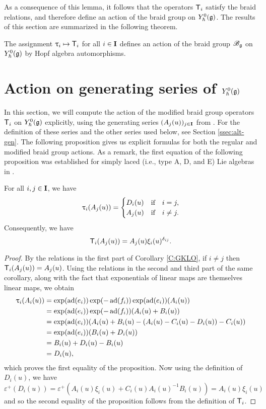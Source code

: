 As a consequence of this lemma, it follows that the operators $\mbraid_i$ satisfy the braid relations, and therefore define an action of the braid group on $\Yhg[0]$.
The results of this section are summarized in the following theorem.

\begin{theorem}\label{T:mbraid-action}
    The assignment $\braid_i\mapsto\mbraid_i$ for all $i\in\I$ defines an action of the braid group $\Bg$ on $\Yhg[0]$ by Hopf algebra automorphisms.
\end{theorem}


\section{Action on generating series of \texorpdfstring{$\Yhg[0]$}{Y0}}

In this section, we will compute the action of the modified braid group operators $\mbraid_i$ on $\Yhg[0]$ explicitly, using the generating series $(A_j(u))_{j\in\I}$ from \cite{gerasimov_class_2005}.
For the definition of these series and the other series used below, see Section \ref{ssec:alt-gen}.
The following proposition gives us explicit formulas for both the regular and modified braid group actions.
As a remark, the first equation of the following proposition was established for simply laced (i.e., type A, D, and E) Lie algebras in \cite[Lemma 5.3.16]{weekes_highest_2016}.

\begin{proposition}\label{P:tau-a}
    For all $i,j\in\I$, we have
    \[\braid_i(A_j(u)) =
    \begin{cases}
        D_i(u) & \text{if}\quad i=j, \\
        A_j(u) & \text{if}\quad i\neq j.
    \end{cases}\]
    Consequently, we have
    \[\mbraid_i(A_j(u)) = A_j(u)\xi_i(u)^{\delta_{ij}}.\]
\end{proposition}
\begin{proof}
    By the relations in the first part of Corollary \ref{C:GKLO}, if $i\neq j$ then $\mbraid_i(A_j(u)) = A_j(u)$.
    Using the relations in the second and third part of the same corollary, along with the fact that exponentials of linear maps are themselves linear maps, we obtain
    \begin{align*}
        \braid_i(A_i(u)) &= \exp(\ad(e_i))\exp(-\ad(f_i))\exp(\ad(e_i))(A_i(u)) \\
        &= \exp(\ad(e_i))\exp(-\ad(f_i))(A_i(u) + B_i(u)) \\
        &= \exp(\ad(e_i))(A_i(u) + B_i(u) - (A_i(u) - C_i(u) - D_i(u)) - C_i(u)) \\
        &= \exp(\ad(e_i))(B_i(u) + D_i(u)) \\
        &= B_i(u) + D_i(u) - B_i(u) \\
        &= D_i(u),
    \end{align*}
    which proves the first equality of the proposition.
    Now using the definition of $D_i(u)$, we have
    \[\varepsilon^+(D_i(u)) = \varepsilon^+(A_i(u)\xi_i(u) + C_i(u)A_i(u)^{-1}B_i(u)) = A_i(u)\xi_i(u)\]
    and so the second equality of the proposition follows from the definition of $\mbraid_i$.
\end{proof}

